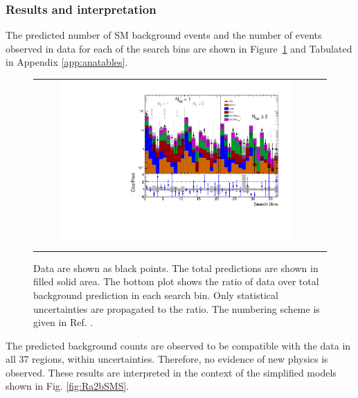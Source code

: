\subsubsection{Results and interpretation}
The predicted number of SM background events and the number of events observed in data for each of the search bins are shown in Figure~\ref{fig:baseline_SR} and Tabulated in Appendix \ref{app:anatables}. 
\begin{figure}[htbp]
  \begin{center}
  \begin{tabular}{cc}
\hspace{-1.5cm}
  \includegraphics[width=0.85\textwidth]{figures/SusySearches/HadStop2015/UnblindPlots.pdf}
  \end{tabular}
  \caption{Data are shown as black points. The total predictions are shown in filled solid area. The bottom plot shows the ratio of data over total background prediction in each search bin. Only statistical uncertainties are propagated to the ratio. The numbering scheme is given in Ref. \cite{CMS:2016nhb}.}
    \label{fig:baseline_SR}
  \end{center}
\end{figure}
The predicted background counts are observed to be compatible with the data in all 37 regions, within uncertainties. Therefore, no evidence of new physics is observed.
These results are interpreted in the context of the simplified models shown in Fig. \ref{fig:Ra2bSMS}.


